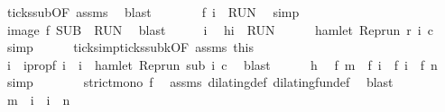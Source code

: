 \begin{isabellebody}
\ ticks{\isacharunderscore}sub{\isacharbrackleft}OF\ assms{\isacharbrackright}\ \isamarkupfalse%
\ blast\isanewline
\ \ \ \ \isamarkupfalse%
\ \isamarkupfalse%
\ {\isacartoucheopen}f\ i\ {\isasymin}\ {\isacharquery}RUN{\isacartoucheclose}\ \isamarkupfalse%
\ simp\isanewline
\ \ \isacommand{{\isacharbraceright}}\isamarkupfalse%
\ \isamarkupfalse%
\ {\isacartoucheopen}image\ f\ {\isacharquery}SUB\ {\isasymsubseteq}\ {\isacharquery}RUN{\isacartoucheclose}\ \isamarkupfalse%
\ blast\isanewline
{}\isamarkupfalse%
\isanewline
\ \ \isacommand{{\isacharbraceleft}}\isamarkupfalse%
\ \isamarkupfalse%
\ i\ \isamarkupfalse%
\ h{\isacharcolon}{\isacartoucheopen}i\ {\isasymin}\ {\isacharquery}RUN{\isacartoucheclose}\isanewline
\ \ \ \ \isamarkupfalse%
\ {\isacartoucheopen}hamlet\ {\isacharparenleft}{\isacharparenleft}Rep{\isacharunderscore}run\ r{\isacharparenright}\ i\ c{\isacharparenright}{\isacartoucheclose}\ \isamarkupfalse%
\ simp\isanewline
\ \ \ \ \isamarkupfalse%
\ ticks{\isacharunderscore}imp{\isacharunderscore}ticks{\isacharunderscore}subk{\isacharbrackleft}OF\ assms\ this{\isacharbrackright}\isanewline
\ \ \ \ \ \ \isamarkupfalse%
\ i\ \ i{}prop{\isacharcolon}{\isacartoucheopen}f\ i\ {\isacharequal}\ i\ {\isasymand}\ hamlet\ {\isacharparenleft}{\isacharparenleft}Rep{\isacharunderscore}run\ sub{\isacharparenright}\ i\ c{\isacharparenright}{\isacartoucheclose}\ \isamarkupfalse%
\ blast\isanewline
\ \ \ \ \isamarkupfalse%
\ h\ \isamarkupfalse%
\ {\isacartoucheopen}f\ m\ {\isacharless}\ f\ i\ {\isasymand}\ f\ i\ {\isasymle}\ f\ n{\isacartoucheclose}\ \isamarkupfalse%
\ simp\isanewline
\ \ \ \ \isamarkupfalse%
\ \isamarkupfalse%
\ {\isacartoucheopen}strict{\isacharunderscore}mono\ f{\isacartoucheclose}\ \isamarkupfalse%
\ assms\ dilating{\isacharunderscore}def\ dilating{\isacharunderscore}fun{\isacharunderscore}def\ \isamarkupfalse%
\ blast\isanewline
\ \ \ \ \isamarkupfalse%
\ \isamarkupfalse%
\ {\isacartoucheopen}m\ {\isacharless}\ i\ {\isasymand}\ i\ {\isasymle}\ n{\isacartoucheclose}\ \isamarkupfalse%

\end{isabellebody}
